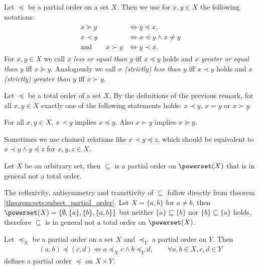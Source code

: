 \begin{remarks}
    \begin{remarkenumerate}
        \item Let $\preceq$ be a partial order on a set $X$. Then we use for $x,y\in X$ the following notations:
        \begin{align}\begin{split}
            x \succeq y &\iff y\preceq x,\\
            x\prec y&\iff x\preceq y\land x\neq y\\
            \text{and}\qquad x\succ y&\iff y\prec x.
        \end{split}\end{align}
        For $x,y\in X$ we call $x$ \emph{less or equal than $y$} iff $x\preceq y$ holds and $x$ \emph{greater or equal than $y$} iff $x\succeq y$. Analogously we call $x$ \emph{(strictly) less than $y$} iff $x\prec y$ holds and $x$ \emph{(strictly) greater than $y$} iff $x\succ y$.
        \item Let $\preceq$ be a total order of a set $X$. By the definitions of the previous remark, for all $x,y\in X$ exactly one of the following statements holds: $x\prec y$, $x=y$ or $x\succ y$.
        \item For all $x,y\in X$, $x\prec y$ implies $x\preceq y$. Also $x\succ y$ implies $x\succeq y$.
        \item Sometimes we use chained relations like $x\prec y\preceq z$, which should be equivalent to $x\prec y\land y\preceq z$ for $x,y,z\in X$.
    \end{remarkenumerate}
\end{remarks}

\begin{examples}
    \begin{exampleenumerate}
        \item Let $X$ be an arbitrary set, then $\subseteq$ is a partial order on $\powerset(X)$ that is in general not a total order.
        \begin{miniproof}
            The reflexivity, antisymmetry and transitivity of $\subseteq$ follow directly from theorem \ref{theorem:sets:subset_partial_order}. Let $X=\{a,b\}$ for $a\neq b$, then $\powerset(X)=\{\emptyset,\{a\},\{b\},\{a,b\}\}$ but neither $\{a\}\subseteq \{b\}$ nor $\{b\}\subseteq\{a\}$ holds, therefore $\subseteq$ is in general not a total order on $\powerset(X)$.
        \end{miniproof}
        \item Let $\preceq_X$ be a partial order on a set $X$ and $\preceq_Y$ a partial order on $Y$. Then \begin{align}(a,b)\preceq(c,d)\iff a\preceq_X c\land b\preceq_Y d,\qquad \forall a,b\in X,c,d\in Y\end{align}
        defines a partial order $\preceq$ on $X\times Y$.
    \end{exampleenumerate}
\end{examples}

